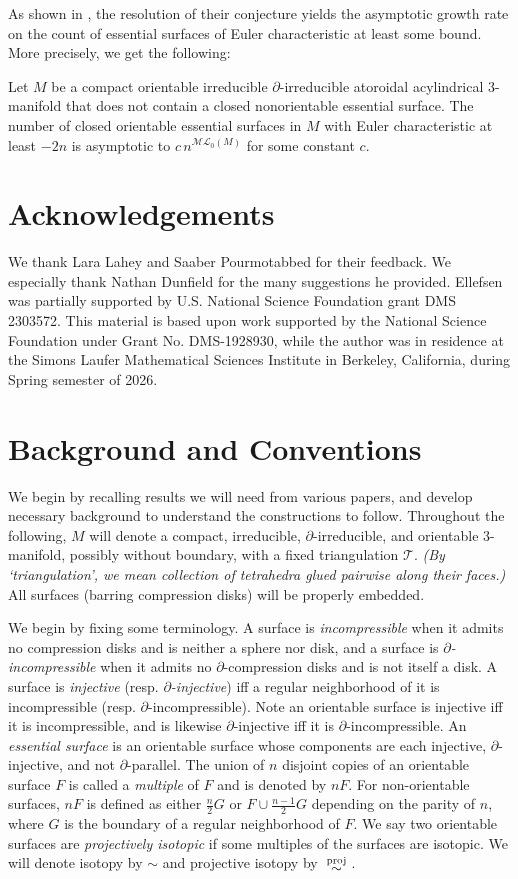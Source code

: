 \documentclass[12pt]{article}
\newcommand{\del}{\partial}
\newcommand{\ML}{\mathcal{ML}}
\newcommand{\T}{\mathcal{T}}
\newcommand{\projsim}{\;\raisebox{-0.1cm}{$\stackrel{\mathrm{proj}}{\sim}$}\;}
\renewcommand{\it}{\textit}
\theoremstyle{nonumberdefinition}
\theoremstyle{empty}
\theoremstyle{empty}
\begin{document}
As shown in \cite{dunfieldCountingEssentialSurfaces2022}, the resolution of their conjecture yields the asymptotic growth rate on the count of essential surfaces of Euler characteristic at least some bound. More precisely, we get the following:

\begin{corollary}
	Let $M$ be a compact orientable irreducible $\del$-irreducible atoroidal acylindrical 3-manifold that does not contain a closed nonorientable essential surface. The number of closed orientable essential surfaces in $M$ with Euler characteristic at least $-2n$ is asymptotic to $c\, n^{\ML_0(M)}$ for some constant $c$.
\end{corollary}

\section*{Acknowledgements}
We thank Lara Lahey and Saaber Pourmotabbed for their feedback. We especially thank Nathan Dunfield for the many suggestions he provided. Ellefsen was partially supported by U.S. National Science Foundation grant DMS 2303572. This material is based upon work supported by the National Science Foundation under Grant No. DMS-1928930, while the author was in residence at the Simons Laufer Mathematical Sciences Institute in Berkeley, California, during Spring semester of 2026.
\pagebreak
\section{Background and Conventions}

We begin by recalling results we will need from various papers, and develop necessary background to understand the constructions to follow. Throughout the following, $M$ will denote a compact, irreducible, $\del$-irreducible, and orientable $3$-manifold, possibly without boundary, with a fixed triangulation $\T$. \it{(By `triangulation', we mean collection of tetrahedra glued pairwise along their faces.)} All surfaces (barring compression disks) will be properly embedded.

We begin by fixing some terminology. A surface is \it{incompressible} when it admits no compression disks and is neither a sphere nor disk, and a surface is \it{$\del$-incompressible} when it admits no $\del$-compression disks and is not itself a disk. A surface is \it{injective} (resp. \it{$\del$-injective}) iff a regular neighborhood of it is incompressible (resp. $\del$-incompressible). Note an orientable surface is injective iff it is incompressible, and is likewise $\del$-injective iff it is $\del$-incompressible. An \it{essential surface} is an orientable surface whose components are each injective, $\del$-injective, and not $\del$-parallel. The union of $n$ disjoint copies of an orientable surface $F$ is called a \it{multiple} of $F$ and is denoted by $nF$. For non-orientable surfaces, $nF$ is defined as either $\tfrac{n}{2}G$ or $F \cup \tfrac{n-1}{2} G$ depending on the parity of $n$, where $G$ is the boundary of a regular neighborhood of $F$. We say two orientable surfaces are \it{projectively isotopic} if some multiples of the surfaces are isotopic. We will denote isotopy by $\sim$ and projective isotopy by \!$\projsim$.
\end{document}
